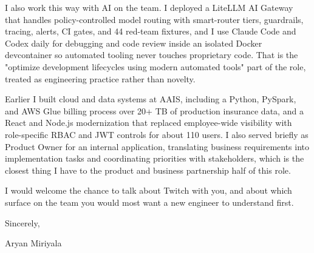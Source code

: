 \documentclass[letterpaper,11pt]{article}
\begin{document}
I also work this way with AI on the team. I deployed a LiteLLM AI Gateway that handles policy-controlled model routing with smart-router tiers, guardrails, tracing, alerts, CI gates, and 44 red-team fixtures, and I use Claude Code and Codex daily for debugging and code review inside an isolated Docker devcontainer so automated tooling never touches proprietary code. That is the "optimize development lifecycles using modern automated tools" part of the role, treated as engineering practice rather than novelty.

Earlier I built cloud and data systems at AAIS, including a Python, PySpark, and AWS Glue billing process over 20+ TB of production insurance data, and a React and Node.js modernization that replaced employee-wide visibility with role-specific RBAC and JWT controls for about 110 users. I also served briefly as Product Owner for an internal application, translating business requirements into implementation tasks and coordinating priorities with stakeholders, which is the closest thing I have to the product and business partnership half of this role.

I would welcome the chance to talk about Twitch with you, and about which surface on the team you would most want a new engineer to understand first.

\vspace{8pt}
Sincerely,

\vspace{6pt}
Aryan Miriyala
\end{document}
